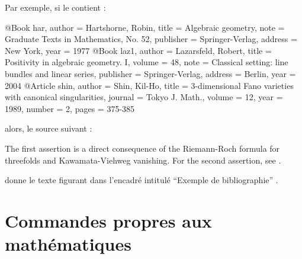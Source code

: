 \documentclass[french,nolocaltoc]{nwejmart}
\newtheorem[title=Fait,style=definition]{fact}
\begin{document}
Par exemple, si le  contient :

\begin{bodycode}[listing only,listing options={morekeywords={Book,Article}}]
@Book{            har,
  author	= {Hartshorne, Robin},
  title		= {Algebraic geometry},
  note		= {Graduate Texts in Mathematics, No. 52},
  publisher	= {Springer-Verlag},
  address	= {New York},
  year		= {1977}
}
@Book{		  laz1,
  author	= {Lazarsfeld, Robert},
  title		= {Positivity in algebraic geometry. {I}},
  volume	= {48},
  note		= {Classical setting: line bundles and linear series},
  publisher	= {Springer-Verlag},
  address	= {Berlin},
  year		= {2004}
}
@Article{         shin,
  author	= {Shin, Kil-Ho},
  title		= {{$3$}-dimensional {F}ano varieties with canonical
                  singularities},
  journal	= {Tokyo J. Math.},
  volume	= {12},
  year		= {1989},
  number	= {2},
  pages	= {375-385}
}
\end{bodycode}

alors, le source  suivant :
\begin{bodycode}[listing only,listing options={deletekeywords={[1]{theorem},[2]{first,and,see}}}]
The first assertion is a direct consequence of the Riemann-Roch
formula for threefolds\autocite[See e.g.][437]{har} and
Kawamata-Viehweg vanishing\autocite[theorem~4.3.1]{laz1}. For the
second assertion, see \textcite[theorem~(0.4)]{shin}.
%
\printbibliography
\end{bodycode}

donne le texte figurant dans l'encadré intitulé \enquote{Exemple de
  bibliographie} .


\section{Commandes propres aux mathématiques}
\label{sec:comm-propr-aux}
\end{document}
